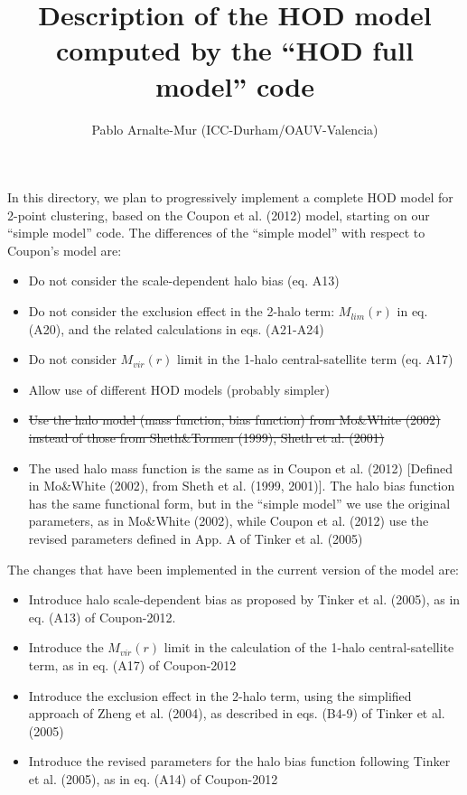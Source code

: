 \documentclass[10pt,a4paper]{article}
\title{Description of the HOD model computed by the ``HOD full model'' code}
\author{Pablo Arnalte-Mur (ICC-Durham/OAUV-Valencia)}
\begin{document}
\maketitle

In this directory, we plan to progressively implement a complete HOD model for 2-point clustering, based on the Coupon et al. (2012) model, starting on our ``simple model'' code. 
The differences of the ``simple model'' with respect to Coupon's model are:

\begin{itemize}

\item Do not consider the scale-dependent halo bias (eq. A13)
\item Do not consider the exclusion effect in the 2-halo term: $M_{lim}(r)$ in eq. (A20),
  and the related calculations in eqs. (A21-A24)
\item Do not consider $M_{vir}(r)$ limit in the 1-halo central-satellite term (eq. A17)
\item Allow use of different HOD models (probably simpler)
\item \sout{Use the halo model (mass function, bias function) from Mo\&White (2002) instead of those from Sheth\&Tormen (1999), Sheth et al. (2001)}
\item The used halo mass function is the same as in Coupon et al. (2012) [Defined in Mo\&White (2002), from Sheth et al. (1999, 2001)]. The halo bias function has the same functional form, but in the ``simple model'' we use the original parameters, as in Mo\&White (2002), while Coupon et al. (2012) use the revised parameters defined in App. A of Tinker et al. (2005)
\end{itemize}


The changes that have been implemented in the current version of the model are:
\begin{itemize}
\item Introduce halo scale-dependent bias as proposed by Tinker et al. (2005), as in eq. (A13) of Coupon-2012.
\item Introduce the $M_{vir}(r)$ limit in the calculation of the 1-halo central-satellite term, as in eq. (A17) of Coupon-2012
\item Introduce the exclusion effect in the 2-halo term, using the simplified approach of Zheng et al. (2004), as described in eqs. (B4-9) of Tinker et al. (2005)
\item Introduce the revised parameters for the halo bias function following Tinker et al. (2005), as in eq. (A14) of Coupon-2012
\end{itemize}
\end{document}
